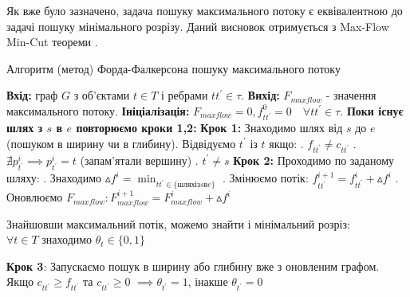 Як вже було зазначено,
задача пошуку максимального потоку є еквівалентною до задачі пошуку мінімального розрізу.
Даний висновок отримується з Max-Flow Min-Cut теореми \cite{ford_fulkerson,edmods_karp}.
\begin{algorithm*}[H]
    \caption{Алгоритм (метод) Форда-Фалкерсона пошуку максимального потоку}
    \begin{algorithmic}
        \State \textbf{Вхід:} граф $G$ з об'єктами $ t \in T $ і ребрами $tt^{'} \in \tau$.
        \State \textbf{Вихід:} $ F_{maxflow} $ - значення максимального потоку.
        \State \textbf{Ініціалізація:} $ F_{maxflow} = 0, f_{tt^{'}}^{0} = 0 \quad \forall tt^{'}  \in \tau $.
        \State \textbf{Поки існує шлях з $s$ в $e$ повторюємо кроки 1,2:}
        \State \textbf{Крок 1:} Знаходимо шлях від $s$ до $e$ (пошуком в ширину чи в глибину).
        \State Відвідуємо $ t^{'}$ із $t $ якщо:
        \State {}. $ f_{tt^{'}} \neq c_{tt^{'}} $
        \State {}. $ \nexists p_{t^{'}}^{i} \implies p_{t^{'}}^{i} = t $ (запам'ятали вершину)
        \State {}. $ t^{'} \neq s $
        \State \textbf{Крок 2:} Проходимо по заданому шляху:
        \State {}. Знаходимо $ \vartriangle f^{i} = \min_{tt^{'} \in \{шлях із s в e \}} $
        \State {}. Змінюємо потік: $ f_{tt^{'}}^{i+1} = f_{tt^{'}}^{i} + \vartriangle f^{i} $
        \State {}. Оновлюємо $ F_{maxflow}: F_{maxflow}^{i+1} = F_{maxflow}^{i} + \vartriangle f^{i} $
    \end{algorithmic}

    Знайшовши максимальний потік, можемо знайти і мінімальний розріз: \\
    $\forall t \in T$ знаходимо $\theta_{t} \in \{0,1\}$
    \begin{algorithmic}
        \State \textbf{Крок 3}: Запускаємо пошук в ширину або глибину вже з оновленим графом.
        \State \qquad Якщо $c_{tt^{'}} \geqslant f_{tt^{'}}$ та $c_{tt^{'}} \geqslant 0$
        $\implies \theta_{t^{'}} = 1 $, інакше $\theta_{t^{'}} = 0 $
    \end{algorithmic}
\end{algorithm*}

